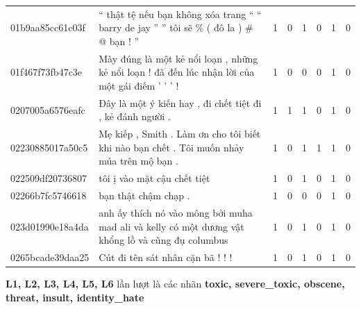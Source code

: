 \begin{table}[htb!]
{\begin{minipage}{0.88\textheight}
\begin{threeparttable}
\begin{tabularx}{\textwidth}{L{0.95} L{6.25} C{0.135} C{0.135} C{0.135} C{0.135} C{0.135} C{0.135}}
                    01b9aa85cc61c03f & `` thật tệ nếu bạn không xóa trang `` `` barry de jay '' '' tôi sẽ \% ( đô la ) \# @ bạn ! ''                                     & 1           & 0           & 1           & 0           & 1           & 0           \\
                    01f467f73fb47c3e & Mày đúng là một kẻ nổi loạn , những kẻ nổi loạn ! đã đến lúc nhận lời của một gái điếm ' ' ' !                                    & 1           & 0           & 0           & 0           & 1           & 0           \\
                    0207005a6576eafc & Đây là một ý kiến hay , đi chết tiệt đi , kẻ đánh người .                                                                         & 1           & 1           & 1           & 0           & 1           & 0           \\
                    02230885017a50c5 & Mẹ kiếp , Smith . Làm ơn cho tôi biết khi nào bạn chết . Tôi muốn nhảy múa trên mộ bạn .                                          & 1           & 0           & 1           & 1           & 1           & 0           \\
                    022509df20736807 & tôi ị vào mặt cậu chết tiệt                                                                                                       & 1           & 0           & 1           & 0           & 1           & 0           \\
                    02266b7fc5746618 & bạn thật chậm chạp .                                                                                                              & 1           & 0           & 0           & 0           & 1           & 0           \\
                    023d01990e18a4da & anh ấy thích nó vào mông bởi muha mad ali và kelly có một dương vật khổng lồ và cũng đụ columbus                                  & 1           & 0           & 1           & 0           & 1           & 0           \\
                    0265bcade39daa25 & Cút đi tên sát nhân cặn bã ! ! !                                                                                                  & 1           & 0           & 1           & 0           & 1           & 0           \\
                    \bottomrule
                \end{tabularx}
                \begin{tablenotes}
                    \fontsize{8pt}{12pt}\selectfont
                    \item \textbf{L1, L2, L3, L4, L5, L6} lần lượt là các nhãn \textbf{toxic, severe\_toxic, obscene, threat, insult, identity\_hate}
                \end{tablenotes}
            \end{threeparttable}
        \end{minipage}%
    }
\end{table}
\clearpage

